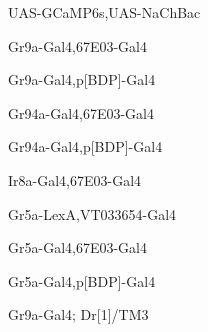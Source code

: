 \documentclass[17pt]{extarticle}
\begin{document}
\footnotesize
\newpage\vspace*{-0.15cm}
\begin{footnotesize}
UAS-GCaMP6s,UAS-NaChBac \\[0.5em]
\end{footnotesize}
\footnotesize
\newpage\vspace*{-0.15cm}
\begin{footnotesize}
Gr9a-Gal4,67E03-Gal4 \\[0.5em]
\end{footnotesize}
\footnotesize
\newpage\vspace*{-0.15cm}
\begin{footnotesize}
Gr9a-Gal4,p[BDP]-Gal4 \\[0.5em]
\end{footnotesize}
\footnotesize
\newpage\vspace*{-0.15cm}
\begin{footnotesize}
Gr94a-Gal4,67E03-Gal4 \\[0.5em]
\end{footnotesize}
\footnotesize
\newpage\vspace*{-0.15cm}
\begin{footnotesize}
Gr94a-Gal4,p[BDP]-Gal4 \\[0.5em]
\end{footnotesize}
\footnotesize
\newpage\vspace*{-0.15cm}
\begin{footnotesize}
Ir8a-Gal4,67E03-Gal4 \\[0.5em]
\end{footnotesize}
\footnotesize
\newpage\vspace*{-0.15cm}
\begin{footnotesize}
Gr5a-LexA,VT033654-Gal4 \\[0.5em]
\end{footnotesize}
\footnotesize
\newpage\vspace*{-0.15cm}
\begin{footnotesize}
Gr5a-Gal4,67E03-Gal4 \\[0.5em]
\end{footnotesize}
\footnotesize
\newpage\vspace*{-0.15cm}
\begin{footnotesize}
Gr5a-Gal4,p[BDP]-Gal4 \\[0.5em]
\end{footnotesize}
\footnotesize
\newpage\vspace*{-0.15cm}
\begin{footnotesize}
Gr9a-Gal4; Dr[1]/TM3 \\[0.5em]
\end{footnotesize}
\end{document}
